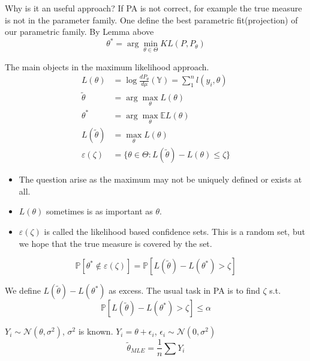 Why is it an useful approach? If PA is not correct, for example the true measure is not in the parameter family. One define the best parametric fit(projection) of our parametric family. By Lemma above
\begin{equation*}
	\theta^* = \arg \min_{\theta \in \Theta} KL(P, P_\theta)
\end{equation*}

The main objects in the maximum likelihood approach.
\begin{align*}
	L(\theta) &= \log \frac{dP_\theta}{d\mu}(\mathbb{Y}) = \sum_1^n l(y_i, \theta)\\
	\tilde{\theta} &= \arg \max_\theta L(\theta)\\
	\theta^* &= \arg \max_\theta \mathbb{E}L(\theta)\\
	L(\tilde{\theta}) &= \max_\theta L(\theta)\\
	\varepsilon(\zeta) &= \{ \theta \in \Theta: L(\tilde{\theta}) - L(\theta) \leq \zeta \}
\end{align*}


\begin{itemize}
	\item The question arise as the maximum may not be uniquely defined or exists at all.
	\item  $L(\theta)$ sometimes is as important as $\theta$.
	\item $\varepsilon(\zeta)$ is called the likelihood based confidence sets. This is a random set, but we hope that the true measure is covered by the set.
\end{itemize}



\begin{lemma}
\begin{equation*}
	\mathbb{P} [\theta^* \notin \varepsilon(\zeta)] = \mathbb{P} [ L(\tilde{\theta}) - L(\theta^*) > \zeta]
\end{equation*}
\end{lemma}

We define $L(\tilde{\theta}) - L(\theta^*)$ as excess. The usual task in PA is to find $\zeta$ s.t.
\begin{equation*}
	\mathbb{P} [ L(\tilde{\theta}) - L(\theta^*) > \zeta] \leq \alpha
\end{equation*}



\begin{example}
$Y_i \sim \mathcal{N}(\theta, \sigma^2)$, $\sigma^2$ is known. $Y_i = \theta + \epsilon_i$, $\epsilon_i \sim \mathcal{N}(0, \sigma^2)$
\begin{equation*}
	\tilde{\theta}_{MLE} = \frac{1}{n}\sum Y_i
\end{equation*}

\end{example}

